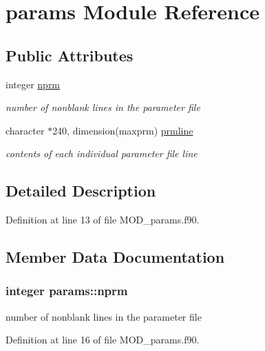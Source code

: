 \hypertarget{classparams}{\section{params Module Reference}
\label{classparams}
}
\subsection*{Public Attributes}
\begin{DoxyCompactItemize}
\item 
integer \hyperlink{classparams_a149ecd9366f8572206110f081cd1026f}{nprm}
\begin{DoxyCompactList}\small\item\em number of nonblank lines in the parameter file \end{DoxyCompactList}\item 
character $\ast$240, dimension(maxprm) \hyperlink{classparams_a47807d7637bc96e234442f7b85ec314d}{prmline}
\begin{DoxyCompactList}\small\item\em contents of each individual parameter file line \end{DoxyCompactList}\end{DoxyCompactItemize}


\subsection{Detailed Description}


Definition at line 13 of file M\-O\-D\-\_\-params.\-f90.



\subsection{Member Data Documentation}
\hypertarget{classparams_a149ecd9366f8572206110f081cd1026f}{
\subsubsection[{nprm}]{\setlength{\rightskip}{0pt plus 5cm}integer params\-::nprm}}\label{classparams_a149ecd9366f8572206110f081cd1026f}


number of nonblank lines in the parameter file 



Definition at line 16 of file M\-O\-D\-\_\-params.\-f90.

